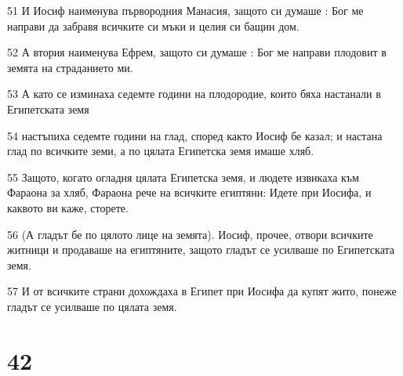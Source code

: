 \par 51 И Иосиф наименува първородния Манасия, защото си думаше : Бог ме направи да забравя всичките си мъки и целия си бащин дом.
\par 52 А втория наименува Ефрем, защото си думаше : Бог ме направи плодовит в земята на страданието ми.
\par 53 А като се изминаха седемте години на плодородие, които бяха настанали в Египетската земя
\par 54 настъпиха седемте години на глад, според както Иосиф бе казал; и настана глад по всичките земи, а по цялата Египетска земя имаше хляб.
\par 55 Защото, когато огладня цялата Египетска земя, и людете извикаха към Фараона за хляб, Фараона рече на всичките египтяни: Идете при Иосифа, и каквото ви каже, сторете.
\par 56 (А гладът бе по цялото лице на земята). Иосиф, прочее, отвори всичките житници и продаваше на египтяните, защото гладът се усилваше по Египетската земя.
\par 57 И от всичките страни дохождаха в Египет при Иосифа да купят жито, понеже гладът се усилваше по цялата земя.

\chapter{42}

